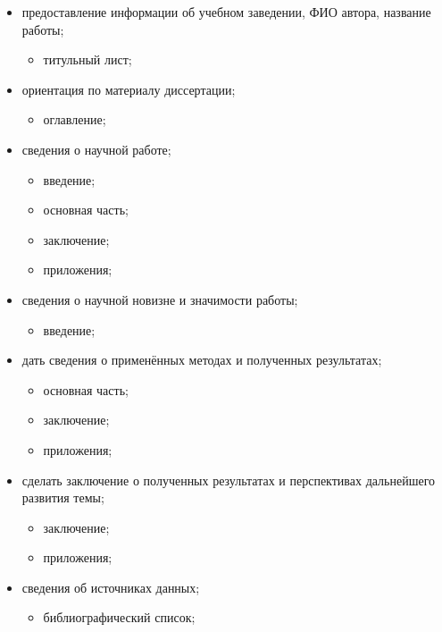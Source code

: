 \documentclass[10pt]{article}
\begin{document}
\begin{enumerate}
\begin{enumerate}
    \begin{itemize}
    \item{предоставление информации об учебном заведении, ФИО автора, название работы;}
      \begin{itemize}
      \item{титульный лист;}
      \end{itemize}
    \item{ориентация по материалу диссертации;}
      \begin{itemize}
        \item{оглавление;}
      \end{itemize}
    \item{сведения о научной работе;}
      \begin{itemize}
      \item{введение;}
      \item{основная часть;}
      \item{заключение;}
      \item{приложения;}
      \end{itemize}
    \item{сведения о научной новизне и значимости работы;}
      \begin{itemize}
      \item{введение;}
      \end{itemize}
    \item{дать сведения о применённых методах и полученных результатах;}
      \begin{itemize}
      \item{основная часть;}
      \item{заключение;}
      \item{приложения;}
      \end{itemize}
    \item{сделать заключение о полученных результатах и перспективах дальнейшего развития темы;}
      \begin{itemize}
      \item{заключение;}
      \item{приложения;}
      \end{itemize}
    \item{сведения об источниках данных;}
      \begin{itemize}
        \item{библиографический список;}
      \end{itemize}
    \end{itemize}
  \end{enumerate}


\end{enumerate}
\end{document}
